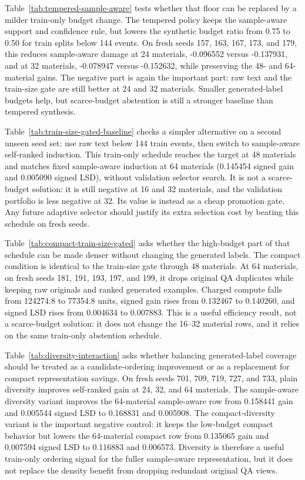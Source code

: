\documentclass[11pt]{article}
\begin{document}
Table~\ref{tab:tempered-sample-aware} tests whether that floor can be replaced
by a milder train-only budget change. The tempered policy keeps the
sample-aware support and confidence rule, but lowers the synthetic budget ratio
from 0.75 to 0.50 for train splits below 144 events. On fresh seeds 157, 163,
167, 173, and 179, this reduces sample-aware damage at 24 materials,
-0.096552 versus -0.137931, and at 32 materials, -0.078947 versus -0.152632,
while preserving the 48- and 64-material gains. The negative part is again the
important part: raw text and the train-size gate are still better at 24 and 32
materials. Smaller generated-label budgets help, but scarce-budget abstention
is still a stronger baseline than tempered synthesis.

Table~\ref{tab:train-size-gated-baseline} checks a simpler alternative on a
second unseen seed set: use raw text below 144 train events, then switch to
sample-aware self-ranked induction. This train-only schedule reaches the target
at 48 materials and matches fixed sample-aware induction at 64 materials
(0.145454 signed gain and 0.005090 signed LSD), without validation selector
search. It is not a scarce-budget solution: it is still negative at 16 and 32
materials, and the validation portfolio is less negative at 32. Its value is
instead as a cheap promotion gate. Any future adaptive selector should justify
its extra selection cost by beating this schedule on fresh seeds.

Table~\ref{tab:compact-train-size-gated} asks whether the high-budget part of
that schedule can be made denser without changing the generated labels. The
compact condition is identical to the train-size gate through 48 materials. At
64 materials, on fresh seeds 181, 191, 193, 197, and 199, it drops original QA
duplicates while keeping raw originals and ranked generated examples. Charged
compute falls from 124274.8 to 77354.8 units, signed gain rises from 0.132467
to 0.140260, and signed LSD rises from 0.004634 to 0.007883. This is a useful
efficiency result, not a scarce-budget solution: it does not change the 16--32
material rows, and it relies on the same train-only abstention schedule.

Table~\ref{tab:diversity-interaction} asks whether balancing generated-label
coverage should be treated as a candidate-ordering improvement or as a
replacement for compact representation savings. On fresh seeds 701, 709, 719,
727, and 733, plain diversity improves self-ranked gain at 24, 32, and 64
materials. The sample-aware diversity variant improves the 64-material
sample-aware row from 0.158441 gain and 0.005544 signed LSD to 0.168831 and
0.005908. The compact-diversity variant is the important negative control: it
keeps the low-budget compact behavior but lowers the 64-material compact row
from 0.135065 gain and 0.007594 signed LSD to 0.116883 and 0.006573.
Diversity is therefore a useful train-only ordering signal for the fuller
sample-aware representation, but it does not replace the density benefit from
dropping redundant original QA views.
\end{document}
